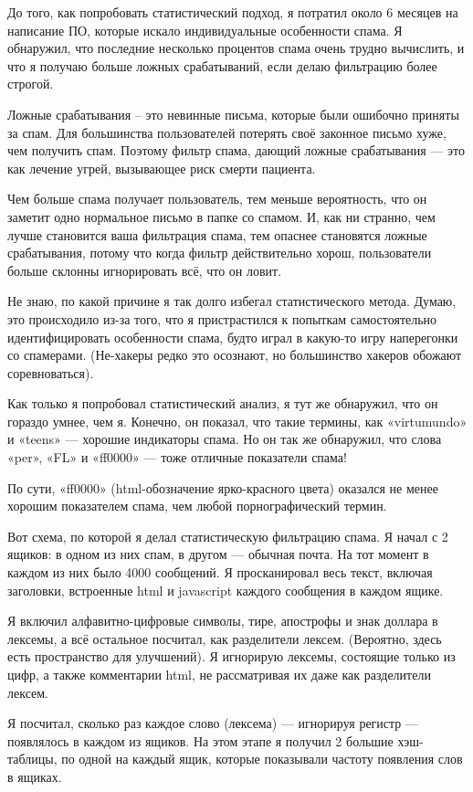 \documentclass[ebook,12pt,oneside,openany]{memoir}
\begin{document}
До того, как попробовать статистический подход, я потратил около 6
месяцев на написание ПО, которые искало индивидуальные особенности
спама. Я обнаружил, что последние несколько процентов спама очень
трудно вычислить, и что я получаю больше ложных срабатываний, если
делаю фильтрацию более строгой.

Ложные срабатывания – это невинные письма, которые были ошибочно
приняты за спам. Для большинства пользователей потерять своё законное
письмо хуже, чем получить спам. Поэтому фильтр спама, дающий ложные
срабатывания — это как лечение угрей, вызывающее риск смерти пациента.

Чем больше спама получает пользователь, тем меньше вероятность, что он
заметит одно нормальное письмо в папке со спамом. И, как ни странно,
чем лучше становится ваша фильтрация спама, тем опаснее становятся
ложные срабатывания, потому что когда фильтр действительно хорош,
пользователи больше склонны игнорировать всё, что он ловит.

Не знаю, по какой причине я так долго избегал статистического метода.
Думаю, это происходило из-за того, что я пристрастился к попыткам
самостоятельно идентифицировать особенности спама, будто играл в
какую-то игру наперегонки со спамерами. (Не-хакеры редко это осознают,
но большинство хакеров обожают соревноваться).

Как только я попробовал статистический анализ, я тут же обнаружил, что
он гораздо умнее, чем я. Конечно, он показал, что такие термины, как
«virtumundo» и «teens» — хорошие индикаторы спама. Но он так же
обнаружил, что слова «per», «FL» и «ff0000» — тоже отличные показатели
спама!

По сути, «ff0000» (html-обозначение ярко-красного цвета) оказался не
менее хорошим показателем спама, чем любой порнографический термин.

Вот схема, по которой я делал статистическую фильтрацию спама. Я начал
с 2 ящиков: в одном из них спам, в другом — обычная почта. На тот
момент в каждом из них было 4000 сообщений. Я просканировал весь
текст, включая заголовки, встроенные html и javascript каждого
сообщения в каждом ящике.

Я включил алфавитно-цифровые символы, тире, апострофы и знак доллара в
лексемы, а всё остальное посчитал, как разделители лексем. (Вероятно,
здесь есть пространство для улучшений). Я игнорирую лексемы, состоящие
только из цифр, а также комментарии html, не рассматривая их даже как
разделители лексем.

Я посчитал, сколько раз каждое слово (лексема) — игнорируя регистр —
появлялось в каждом из ящиков. На этом этапе я получил 2 большие
хэш-таблицы, по одной на каждый ящик, которые показывали частоту
появления слов в ящиках.
\end{document}
